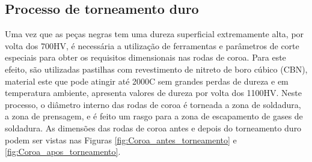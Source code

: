 \subsection{Processo de torneamento duro} \label{ssec:materiais_CS_torneamento}
Uma vez que as peças negras tem uma dureza superficial extremamente alta, por volta dos 700HV, é necessária a utilização de ferramentas e parâmetros de corte especiais para obter os requisitos dimensionais nas rodas de coroa. Para este efeito, são utilizadas pastilhas com revestimento de nitreto de boro cúbico (CBN), material este que pode atingir até 2000\textdegree C sem grandes perdas de dureza e em temperatura ambiente, apresenta valores de dureza por volta dos 1100HV. Neste processo, o diâmetro interno das rodas de coroa é torneada a zona de soldadura, a zona de prensagem, e é feito um rasgo para a zona de escapamento de gases de soldadura. As dimensões das rodas de coroa antes e depois do torneamento duro podem ser vistas nas Figuras \ref{fig:Coroa_antes_torneamento} e \ref{fig:Coroa_apos_torneamento}.

